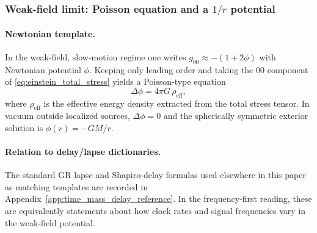 \subsubsection{Weak-field limit: Poisson equation and a \texorpdfstring{$1/r$}{1/r} potential}
\label{subsec:weak_field_poisson}

\paragraph{Newtonian template.}
\InterfaceTag In the weak-field, slow-motion regime one writes
$g_{00}\approx -(1+2\phi)$ with Newtonian potential $\phi$.
Keeping only leading order and taking the $00$ component of \eqref{eq:einstein_total_stress} yields a Poisson-type equation
\[
\Delta\phi = 4\pi G\,\rho_{\mathrm{eff}},
\]
where $\rho_{\mathrm{eff}}$ is the effective energy density extracted from the total stress tensor.
In vacuum outside localized sources, $\Delta\phi=0$ and the spherically symmetric exterior solution is $\phi(r)=-GM/r$.

\paragraph{Relation to delay/lapse dictionaries.}
\MatchTag The standard GR lapse and Shapiro-delay formulas used elsewhere in this paper as matching templates are recorded in Appendix~\ref{app:time_mass_delay_reference}.
In the frequency-first reading, these are equivalently statements about how clock rates and signal frequencies vary in the weak-field potential.


